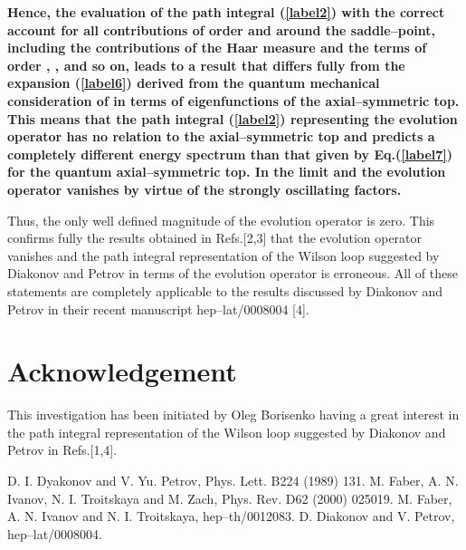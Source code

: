\documentclass[a4paper,11pt]{article}
\begin{document}
{\bf Hence, the evaluation of the path integral (\ref{label2}) with
the correct account for all contributions of order
\coordHE{} and \coordHE{} around the
saddle--point, including the contributions of the Haar measure and the
terms of order \coordHE{},
\coordHE{}, \coordHE{} and so on,
leads to a result that differs fully from the expansion (\ref{label6})
derived from the quantum mechanical consideration of \coordHE{} in terms of eigenfunctions of the axial--symmetric top. This
means that the path integral (\ref{label2}) representing the evolution
operator \coordHE{} has no relation to the
axial--symmetric top and predicts a completely different energy
spectrum than that given by Eq.(\ref{label7}) for the quantum
axial--symmetric top. In the limit \coordHE{} and
\coordHE{} the evolution operator vanishes by virtue of the
strongly oscillating factors.}

Thus, the only well defined magnitude of the evolution operator is
zero. This confirms fully the results obtained in Refs.[2,3] that the
evolution operator \coordHE{} vanishes and the path
integral representation of the Wilson loop suggested by Diakonov and
Petrov in terms of the evolution operator \coordHE{} is
erroneous. All of these statements are completely applicable to the
results discussed by Diakonov and Petrov in their recent manuscript
hep--lat/0008004 [4].

\section*{Acknowledgement}

\hspace{0.2in} This investigation has been initiated by Oleg Borisenko
having a great interest in the path integral representation of the
Wilson loop suggested by Diakonov and Petrov in Refs.[1,4].

\newpage

\begin{thebibliography}{9}
\bibitem{[1]} 
D. I. Dyakonov and V. Yu. Petrov, Phys. Lett. B224
(1989) 131.
\bibitem{[2]} 
M. Faber, A. N. Ivanov, N. I. Troitskaya  and M. Zach,
Phys. Rev. D62 (2000) 025019.
\bibitem{[3]} 
M. Faber, A. N. Ivanov and  N. I. Troitskaya, hep--th/0012083.
\bibitem{[4]} 
D. Diakonov and V. Petrov,  hep--lat/0008004.
\end{thebibliography}
\end{document}
